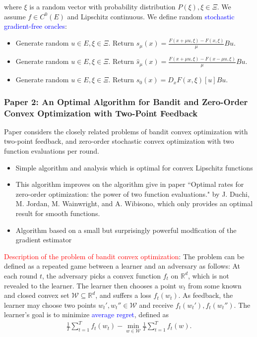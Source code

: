 \documentclass{article}
\begin{document}
where $\xi$ is a random vector with probability distribution $P(\xi), \xi \in \Xi$. We assume $f \in C^0(E)$ and Lipschitz continuous. We define random \textcolor{blue}{stochastic gradient-free oracles}:

\begin{itemize}
    \item Generate random $u \in E, \xi \in \Xi$. Return $s_{\mu}(x) = \frac{F(x+\mu u,\xi) - F(x,\xi)}{\mu} Bu$.
    \item Generate random $u \in E, \xi \in \Xi$. Return $\hat{s}_{\mu}(x) = \frac{F(x+\mu u,\xi) - F(x-\mu u,\xi)}{\mu} Bu$. 
    \item Generate random $u \in E, \xi \in \Xi$. Return $s_0(x) = D_xF(x,\xi)[u] Bu$.
\end{itemize}

\subsubsection{Paper 2: An Optimal Algorithm for Bandit and Zero-Order Convex Optimization with Two-Point Feedback}

Paper considers the closely related problems of bandit convex optimization with two-point feedback, and zero-order stochastic convex optimization with two function evaluations per round.

\begin{itemize}
    \item Simple algorithm and analysis which is optimal for convex Lipschitz functions
    \item This algorithm improves on the algorithm give in paper ``Optimal rates for zero-order optimization: the power of two function evaluations." by J. Duchi, M. Jordan, M. Wainwright, and A. Wibisono, which only provides an optimal result for smooth functions.
    \item Algorithm based on a small but surprisingly powerful modfication of the gradient estimator
\end{itemize}

\textcolor{red}{Description of the problem of bandit convex optimization}: The problem can be defined as a repeated game between a learner and an adversary as follows: At each round $t$, the adversary picks a convex function $f_t$ on $\mathbb{R}^d$, which is not revealed to the learner. The learner then chooses a point $w_t$ from some known and closed convex set $\mathcal{W} \subseteq \mathbb{R}^d$, and suffers a loss $f_t(w_t)$. As feedback, the learner may choose two points $w_t', w_t'' \in \mathcal{W}$ and receive $f_t(w_t'), f_t(w_t'')$. The learner's goal is to minimize \textcolor{blue}{average regret}, defined as 
\begin{align}
    \frac{1}{T}\sum_{t = 1}^Tf_t(w_t) - \min_{w \in \mathcal{W}}\frac{1}{T}\sum_{t=1}^Tf_t(w). \label{regret}
\end{align}
\end{document}
